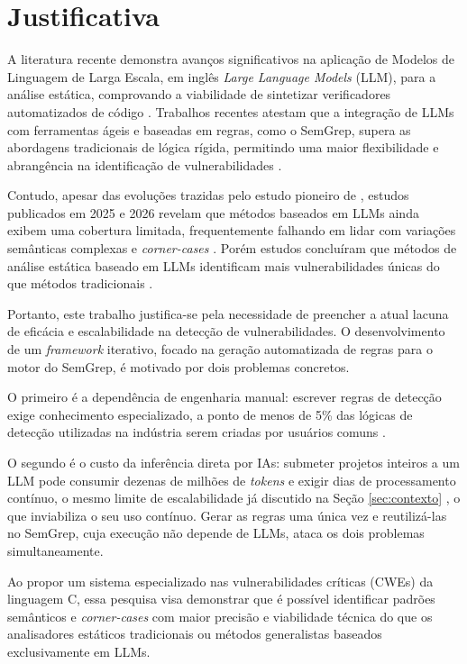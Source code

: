 \documentclass[
    12pt,                %
    openright,           %
    oneside,             %
    a4paper,             %
    english,             %
    brazil               %
]{abntex2}
\begin{document}
\section{Justificativa}
\label{sec:justificativa}
\par
A literatura recente demonstra avanços significativos na aplicação de Modelos de Linguagem de Larga Escala, em inglês \textit{Large Language Models} (LLM), para a análise estática, comprovando a viabilidade de sintetizar verificadores automatizados de código \cite{hou2025generation, yang2025knighter}.
Trabalhos recentes atestam que a integração de LLMs com ferramentas ágeis e baseadas em regras, como o SemGrep, supera as abordagens tradicionais de lógica rígida, permitindo uma maior flexibilidade e abrangência na identificação de vulnerabilidades \cite{hou2025generation, yang2025knighter}.
\par
Contudo, apesar das evoluções trazidas pelo estudo pioneiro de , estudos publicados em 2025 e 2026 revelam que métodos baseados em LLMs ainda exibem uma cobertura limitada, frequentemente falhando em lidar com variações semânticas complexas e \textit{corner-cases} \cite{hou2025generation, yang2025knighter}.
Porém estudos concluíram que métodos de análise estática baseado em LLMs identificam mais vulnerabilidades únicas do que métodos tradicionais \cite{yang2025knighter, hou2025generation}.
\par
Portanto, este trabalho justifica-se pela necessidade de preencher a atual lacuna de eficácia e escalabilidade na detecção de vulnerabilidades.
O desenvolvimento de um \textit{framework} iterativo, focado na geração automatizada de regras para o motor do SemGrep, é motivado por dois problemas concretos.
\par
O primeiro é a dependência de engenharia manual: escrever regras de detecção exige conhecimento especializado, a ponto de menos de 5\% das lógicas de detecção utilizadas na indústria serem criadas por usuários comuns \cite{hou2025generation}.
\par
O segundo é o custo da inferência direta por IAs: submeter projetos inteiros a um LLM pode consumir dezenas de milhões de \textit{tokens} e exigir dias de processamento contínuo, o mesmo limite de escalabilidade já discutido na Seção \ref{sec:contexto} \cite{hou2025generation}, o que inviabiliza o seu uso contínuo.
Gerar as regras uma única vez e reutilizá-las no SemGrep, cuja execução não depende de LLMs, ataca os dois problemas simultaneamente.
\par
Ao propor um sistema especializado nas vulnerabilidades críticas (CWEs) da linguagem C, essa pesquisa visa demonstrar que é possível identificar padrões semânticos e \textit{corner-cases} com maior precisão e viabilidade técnica do que os analisadores estáticos tradicionais ou métodos generalistas baseados exclusivamente em LLMs.
\end{document}
